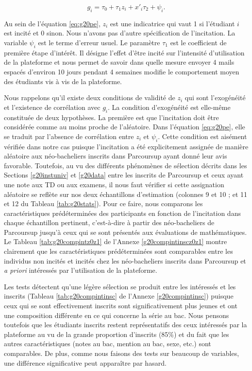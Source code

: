 \documentclass[
]{book}
\begin{document}
\begin{equation}
\label{eq:g20pe}
g_i = \tau_0 + \tau_1 z_i + x'_i \tau_2 + \psi_i.
\end{equation}

Au sein de l'équation \eqref{eq:g20pe}, \(z_i\) est une indicatrice qui vaut 1 si l'étudiant \(i\) est incité et 0 sinon. Nous n'avons pas d'autre spécification de l'incitation. La variable \(\psi_i\) est le terme d'erreur usuel. Le paramètre \(\tau_1\) est le coefficient de première étape d'intérêt. Il désigne l'effet d'être incité sur l'intensité d'utilisation de la plateforme et nous permet de savoir dans quelle mesure envoyer 4 mails espacés d'environ 10 jours pendant 4 semaines modifie le comportement moyen des étudiants vis à vis de la plateforme.

\quad Nous rappelons qu'il existe deux conditions de validité de \(z_i\) qui sont l'exogénéité et l'existence de corrélation avec \(g_i\). La condition d'exogénéité est elle-même constituée de deux hypothèses. La première est que l'incitation doit être considérée comme au moins proche de l'aléatoire. Dans l'équation \eqref{eq:g20pe}, elle se traduit par l'absence de corrélation entre \(z_i\) et \(\psi_i\). Cette condition est aisément vérifiée dans notre cas puisque l'incitation a été explicitement assignée de manière aléatoire aux néo-bacheliers inscrits dans Parcoursup ayant donné leur avis favorable. Toutefois, au vu des différents phénomènes de sélection décrits dans les Sections \ref{g20instuniv} et \ref{g20data} entre les inscrits de Parcoursup et ceux ayant une note aux TD ou aux examens, il nous faut vérifier si cette assignation aléatoire se reflète sur nos deux échantillons d'estimation (colonnes 9 et 10 ; et 11 et 12 du Tableau \ref{tab:g20stats}). Pour ce faire, nous comparons les caractéristiques prédéterminées des participants en fonction de l'incitation dans chaque échantillon pertinent, c'est-à-dire à partir des néo-bacheliers de Parcoursup jusqu'à ceux qui se sont présentés aux évaluations de mathématiques. Le Tableau \ref{tab:g20compintz0z1} de l'Annexe \ref{g20compintinscz0z1} montre clairement que les caractéristiques prédéterminées sont comparables entre les individus non incités et incités chez les néo-bacheliers inscrits dans Parcoursup et \emph{a priori} intéressés par l'utilisation de la plateforme.

Les tests détectent qu'une légère sélection se produit entre les intéressés et les inscrits (Tableau \ref{tab:g20compintinsc} de l'Annexe \ref{g20compintinsc}) puisque ceux qui se sont effectivement inscrits sont significativement plus jeunes et ont une composition différente en ce qui concerne la série au bac. Nous pensons toutefois que les étudiants inscrits restent représentatifs des ceux intéressés par la plateforme au vu de la grande proportion d'inscrits (85\%) et du fait que les autres caractéristiques (notes au bac, mention au bac, sexe, etc.) sont comparables. De plus, comme nous faisons des tests sur beaucoup de variables, une différence significative peut apparaître par hasard.
\end{document}
